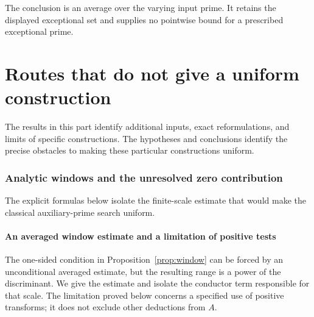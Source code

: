 \documentclass[11pt]{article}
\theoremstyle{definition}
\theoremstyle{remark}
\begin{document}
The conclusion is an average over the varying input prime.
It retains the displayed exceptional set and supplies no
pointwise bound for a prescribed exceptional prime.


\part{Routes that do not give a uniform construction}
\label{part:nonuniform-routes}
The results in this part identify additional inputs, exact reformulations, and limits of specific constructions. The hypotheses and conclusions identify the precise obstacles to making these particular constructions uniform.

\section{Analytic windows and the unresolved zero contribution}
The explicit formulas below isolate the finite-scale estimate that would make the classical auxiliary-prime search uniform.

\subsection{An averaged window estimate and a limitation of positive tests}
\label{sec:positive-window-tests}

The one-sided condition in Proposition~\ref{prop:window} can be
forced by an unconditional averaged estimate, but the resulting range
is a power of the discriminant.  We give the estimate and isolate the
conductor term responsible for that scale.  The limitation proved below
concerns a specified use of positive transforms; it does not exclude
other deductions from $A$.
\end{document}
